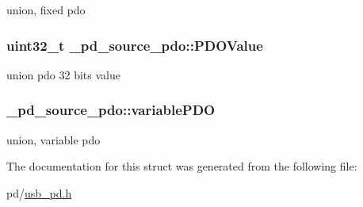 union, fixed pdo \hypertarget{struct__pd__source__pdo_ae7c1220b81dd8506c6731d7a6adc6ac9}{
\subsubsection[{P\-D\-O\-Value}]{\setlength{\rightskip}{0pt plus 5cm}uint32\-\_\-t \-\_\-pd\-\_\-source\-\_\-pdo\-::\-P\-D\-O\-Value}}\label{struct__pd__source__pdo_ae7c1220b81dd8506c6731d7a6adc6ac9}
union pdo 32 bits value \hypertarget{struct__pd__source__pdo_a81d5ae3b407a289661136aa515ba1942}{
\subsubsection[{variable\-P\-D\-O}]{ \-\_\-pd\-\_\-source\-\_\-pdo\-::variable\-P\-D\-O}}\label{struct__pd__source__pdo_a81d5ae3b407a289661136aa515ba1942}
union, variable pdo 

The documentation for this struct was generated from the following file\-:\begin{DoxyCompactItemize}
\item 
pd/\hyperlink{usb__pd_8h}{usb\-\_\-pd.\-h}\end{DoxyCompactItemize}
